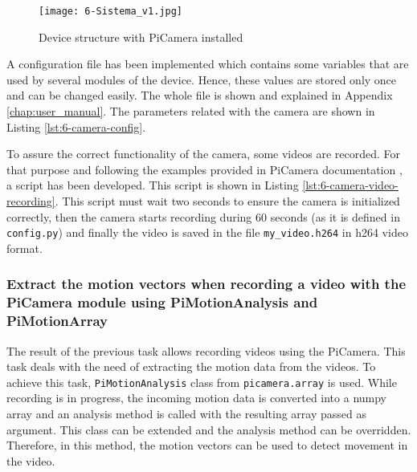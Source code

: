 \begin{figure}[!h]
	\begin{center}
		\texttt{[image: 6-Sistema\_v1.jpg]}
		\caption{Device structure with PiCamera installed}
		\label{fig:6-Sistema_v1}
	\end{center}
\end{figure}

A configuration file has been implemented which contains some variables that are used by several modules of the device. Hence, these values are stored only once and can be changed easily. The whole file is shown and explained in Appendix \ref{chap:user_manual}. The parameters related with the camera are shown in Listing \ref{lst:6-camera-config}.



To assure the correct functionality of the camera, some videos are recorded. For that purpose and following the examples provided in PiCamera documentation \cite{PiCameraDoc}, a script has been developed. This script is shown in Listing \ref{lst:6-camera-video-recording}. This script must wait two seconds to ensure the camera is initialized correctly, then the camera starts recording during 60 seconds (as it is defined in \texttt{config.py}) and finally the video is saved in the file \texttt{my\_video.h264} in h264 video format.




\subsubsection{Extract the motion vectors when recording a video with the PiCamera module using PiMotionAnalysis and PiMotionArray}
The result of the previous task allows recording videos using the PiCamera. This task deals with the need of extracting the motion data from the videos. To achieve this task, \texttt{PiMotionAnalysis} class from \texttt{picamera.array} is used. While recording is in progress, the incoming motion data is converted into a numpy array and an analysis method is called with the resulting array passed as argument. This class can be extended and the analysis method can be overridden. Therefore, in this method, the motion vectors can be used to detect movement in the video.

